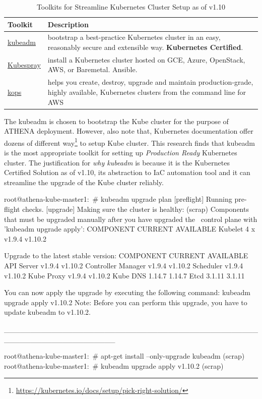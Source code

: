 \begin{table}[H]
\centering
    \begin{tabular}{ | l | p{12cm} |}
    \hline
    Toolkit & Description \\ \hline
    \href{https://kubernetes.io/docs/setup/independent/create-cluster-kubeadm/}{kubeadm} & bootstrap a best-practice Kubernetes cluster in an easy, reasonably secure and extensible way. \textbf{Kubernetes Certified}. \\ \hline
    \href{https://github.com/kubernetes-incubator/kubespray}{Kubespray} & install a Kubernetes cluster hosted on GCE, Azure, OpenStack, AWS, or Baremetal. Ansible. \\  \hline
    \href{https://github.com/kubernetes/kops}{kops} & helps you create, destroy, upgrade and maintain production-grade, highly available, Kubernetes clusters from the command line for AWS \\
    \hline
    \end{tabular}
\caption{Toolkits for Streamline Kubernetes Cluster Setup as of v1.10}
\label{kubeToolkits}
\end{table}

The kubeadm is chosen to bootstrap the Kube cluster for the purpose of ATHENA deployment. However, also note that, Kubernetes documentation offer dozens of different way\footnote{\url{https://kubernetes.io/docs/setup/pick-right-solution/}} to setup Kube cluster. This research finds that kubeadm is the most appropriate toolkit for setting up \emph{Production Ready} Kubernetes cluster. The justification for \emph{why kubeadm} is because it is the Kubernetes Certified Solution as of v1.10, its abstraction to IaC automation tool and it can streamline the upgrade of the Kube cluster reliably.

\begin{small}
\begin{lcverbatim}
root@athena-kube-master1:~# kubeadm upgrade plan
[preflight] Running pre-flight checks.
[upgrade] Making sure the cluster is healthy:
(scrap)
Components that must be upgraded manually after you have upgraded the \
   control plane with 'kubeadm upgrade apply':
COMPONENT   CURRENT      AVAILABLE
Kubelet     4 x v1.9.4   v1.10.2

Upgrade to the latest stable version:
COMPONENT            CURRENT   AVAILABLE
API Server           v1.9.4    v1.10.2
Controller Manager   v1.9.4    v1.10.2
Scheduler            v1.9.4    v1.10.2
Kube Proxy           v1.9.4    v1.10.2
Kube DNS             1.14.7    1.14.7
Etcd                 3.1.11    3.1.11

You can now apply the upgrade by executing the following command:
	kubeadm upgrade apply v1.10.2
Note: Before you can perform this upgrade, you have to update kubeadm to v1.10.2.

_____________________________________________________________________

root@athena-kube-master1:~# apt-get install --only-upgrade kubeadm
(scrap)
root@athena-kube-master1:~# kubeadm upgrade apply v1.10.2
(scrap)
\end{lcverbatim}
\end{small}

